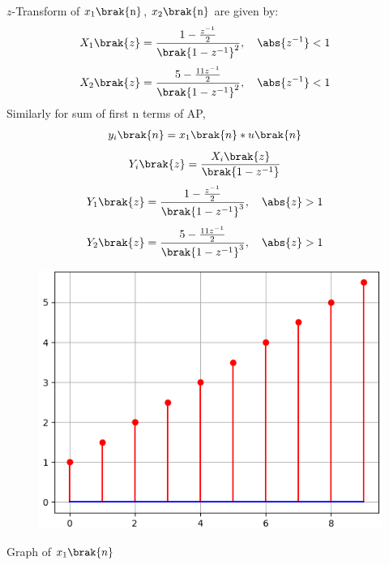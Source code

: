 \documentclass[journal,12pt,twocolumn]{IEEEtran}
\theoremstyle{remark}
\begin{document}
$z$-Transform of $x_1\brak{\text{n}}$, $x_2\brak{\text{n}}$ are given by:
\begin{align} X_1\brak{z}&=\frac{1-\frac{z^{-1}}{2}}{\brak{1-z^{-1}}^2},\quad \abs{z^{-1}}<1
\end{align}
\begin{align}X_2\brak{z}&=\frac{5-\frac{11z^{-1}}{2}}{\brak{1-z^{-1}}^2},\quad \abs{z^{-1}}<1
\end{align}
Similarly for sum of first n terms of AP,
\begin{align}
y_i\brak{n}&=x_1\brak{n}*u\brak{n}
\end{align}
\begin{align}
\label{w1}
Y_i\brak{z}&=\frac{X_i\brak{z}}{\brak{1-z^{-1}}}
\end{align}
\begin{align}
Y_1\brak{z}&=\frac{1-\frac{z^{-1}}{2}}{\brak{1-z^{-1}}^3},\quad \abs{z}>1
\end{align}
\begin{align}Y_2\brak{z}&=\frac{5-\frac{11z^{-1}}{2}}{\brak{1-z^{-1}}^3},\quad \abs{z}>1
\end{align}
\begin{figure}[h]
    \centering
    \includegraphics[scale=0.60]{ncert-maths/10/5/4/2/figs/py_3.png}
    \label{fig:x1n}
\end{figure}
\begin{center}
    Graph of $x_1\brak{n}$
\end{center}
\end{document}
